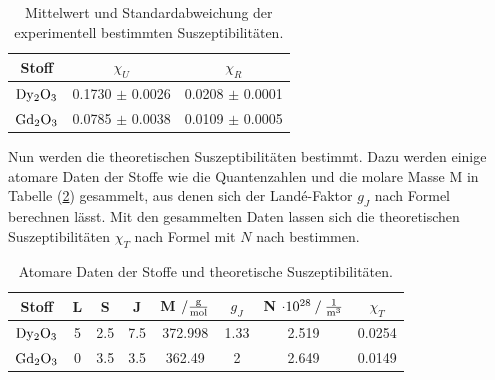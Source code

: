 \begin{table}
    \centering
    \begin{tabular}{c c c}
        \toprule
        {Stoff} & {$\chi_U $} & {$\chi_R $} \\
    \midrule
    $\ce{Dy2O3}$ & 0.1730 $\pm$ 0.0026  &  0.0208 $\pm$ 0.0001 \\
    $\ce{Gd2O3}$ & 0.0785 $\pm$ 0.0038  & 0.0109  $\pm$ 0.0005 \\
    \bottomrule
\end{tabular}
\caption{Mittelwert und Standardabweichung der experimentell bestimmten Suszeptibilitäten.}
\label{tab:expsus}
\end{table}

\newpage
\noindent
Nun werden die theoretischen Suszeptibilitäten bestimmt.
Dazu werden einige atomare Daten der Stoffe wie die Quantenzahlen und die molare Masse M in Tabelle (\ref{tab:th1}) gesammelt, aus denen sich der Landé-Faktor $g_J$ nach Formel %
berechnen lässt.
Mit den gesammelten Daten lassen sich die theoretischen Suszeptibilitäten $\chi_T$ nach Formel mit $N$ nach bestimmen. %


\begin{table}
    \centering
    \begin{tabular}{c c c c c c c c}
        \toprule
        {Stoff} & {L} & {S} & {J} & {M $\mathbin{/} \si[per-mode=fraction]{\gram\per\mol}$ } & {$g_J$} & {N $\cdot 10^{28} \mathbin{/} \si[per-mode=fraction]{\per\cubic\meter} $} & {$\chi_T$} \\
    \midrule
    $\ce{Dy2O3}$ & 5 & 2.5 & 7.5 & 372.998 & 1.33 & 2.519 & 0.0254 \\
    $\ce{Gd2O3}$ & 0 & 3.5 & 3.5 & 362.49  & 2    & 2.649 & 0.0149 \\
    \bottomrule
\end{tabular}
\caption{Atomare Daten der Stoffe und theoretische Suszeptibilitäten.}
\label{tab:th1}
\end{table}